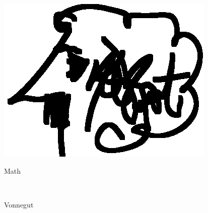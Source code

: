 \documentclass[12pt]{resume}
\begin{document}
\begin{minipage}[t]{0.48\textwidth}
\begin{minipage}[t]{0.1\textwidth}
        {\par \includegraphics[scale=.2]{vonnegut}}
    \end{minipage}
    \begin{minipage}[t]{0.38\textwidth}
        {\par \large Math }\\
        {\par \large Vonnegut }
    \end{minipage}
    \end{minipage}
\end{document}
